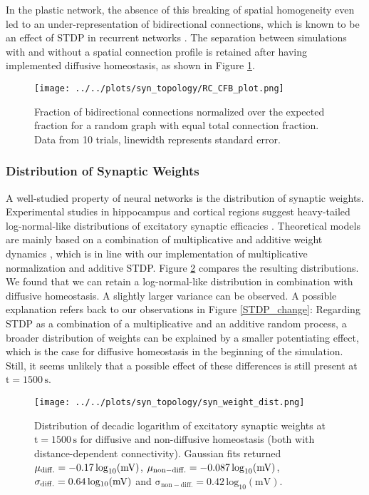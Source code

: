 \documentclass[10pt,a4paper]{article}
\begin{document}
In the plastic network, the absence of this breaking of spatial homogeneity even led to an under-representation of bidirectional connections, which is known to be an effect of STDP in recurrent networks \cite{Syn_Plast_Abbott}. The separation between simulations with and without a spatial connection profile is retained after having implemented diffusive homeostasis, as shown in Figure \ref{RC_CFB_plot}. 
\begin{figure}
\texttt{[image: ../../plots/syn\_topology/RC\_CFB\_plot.png]}
\caption{Fraction of bidirectional connections normalized over the expected fraction for a random graph with equal total connection fraction. Data from 10 trials, linewidth represents standard error.}
\label{RC_CFB_plot}
\end{figure}
\subsubsection{Distribution of Synaptic Weights} \label{Syn_Weight_Dist_Section}
A well-studied property of neural networks is the distribution of synaptic weights. Experimental studies in hippocampus and cortical regions suggest heavy-tailed log-normal-like distributions of excitatory synaptic efficacies \cite{Song_Connectivity_2005,Lisman_Synapses_1993,Yasumatsu_Synapses_2008,Loewenstein_Spine_Sizes}. Theoretical models are mainly based on a combination of multiplicative and additive weight dynamics \cite{Loewenstein_Spine_Sizes,Statman_Synapses_2014}, which is in line with our implementation of multiplicative normalization and additive STDP. Figure \ref{Weight_Dist} compares the resulting distributions. We found that we can retain a log-normal-like distribution in combination with diffusive homeostasis. A slightly larger variance can be observed. A possible explanation refers back to our observations in Figure \ref{STDP_change}: Regarding STDP as a combination of a multiplicative and an additive random process, a broader distribution of weights can be explained by a smaller potentiating effect, which is the case for diffusive homeostasis in the beginning of the simulation. Still, it seems unlikely that a possible effect of these differences is still present at $\mathrm{t=1500\,s}$.
\begin{figure}
\texttt{[image: ../../plots/syn\_topology/syn\_weight\_dist.png]}
\caption{Distribution of decadic logarithm of excitatory synaptic weights at $\mathrm{t=1500\,s}$ for diffusive and non-diffusive homeostasis (both with distance-dependent connectivity). Gaussian fits returned $\mathrm{\mu_{\rm diff.}=-0.17\, \mathrm{log}_{10}(mV)}$, $\mathrm{\mu_{\rm non-diff.}=-0.087\, \mathrm{log}_{10}(mV)}$, $\mathrm{\sigma_{\rm diff.}=0.64\, log_{10}(mV)}$ and $\mathrm{\sigma_{non-diff.}=0.42\, log_{10}(mV)}$.}
\label{Weight_Dist}
\end{figure}
\end{document}
